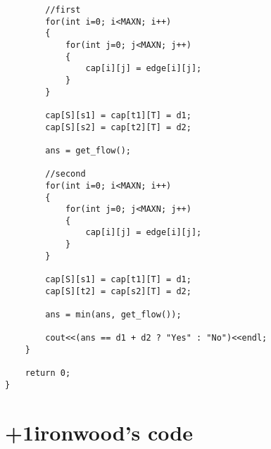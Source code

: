 \documentclass[10pt,twocolumn,oneside]{article}
\begin{document}
\begin{lstlisting}
        //first
        for(int i=0; i<MAXN; i++)
        {
            for(int j=0; j<MAXN; j++)
            {
                cap[i][j] = edge[i][j];
            }
        }

        cap[S][s1] = cap[t1][T] = d1;
        cap[S][s2] = cap[t2][T] = d2;

        ans = get_flow();

        //second
        for(int i=0; i<MAXN; i++)
        {
            for(int j=0; j<MAXN; j++)
            {
                cap[i][j] = edge[i][j];
            }
        }

        cap[S][s1] = cap[t1][T] = d1;
        cap[S][t2] = cap[s2][T] = d2;

        ans = min(ans, get_flow());

        cout<<(ans == d1 + d2 ? "Yes" : "No")<<endl;
    }

    return 0;
}
\end{lstlisting}
\section{+1ironwood's code}
\end{document}
